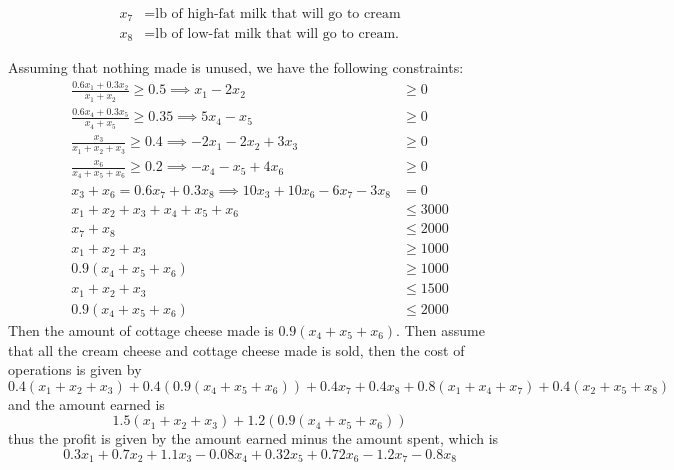 \documentclass{article}
\begin{document}
\begin{enumerate}
\begin{align*}
			x_7 &= \text{lb of high-fat milk that will go to cream} \\
			x_8 &= \text{lb of low-fat milk that will go to cream.} 
		\end{align*}
		\begin{soln}
			Assuming that nothing made is unused, we have the following constraints:
			\begin{align*}
				\frac{0.6x_1+0.3x_2}{x_1+x_2} \ge 0.5 \implies x_1-2x_2 &\ge 0 \\
				\frac{0.6x_4+0.3x_5}{x_4+x_5} \ge 0.35 \implies 5x_4-x_5 &\ge 0 \\
				\frac{x_3}{x_1+x_2+x_3} \ge 0.4 \implies -2x_1-2x_2+3x_3 &\ge 0 \\
				\frac{x_6}{x_4+x_5+x_6} \ge 0.2 \implies -x_4-x_5+4x_6 &\ge 0 \\
				x_3+x_6=0.6x_7+0.3x_8 \implies 10x_3+10x_6-6x_7-3x_8 &= 0 \\
				x_1+x_2+x_3+x_4+x_5+x_6 &\le 3000 \\
				x_7+x_8 &\le 2000 \\
				x_1+x_2+x_3 &\ge 1000 \\
				0.9(x_4+x_5+x_6) &\ge 1000 \\
				x_1+x_2+x_3 &\le 1500 \\
				0.9(x_4+x_5+x_6) &\le 2000
			\end{align*} 
			Then the amount of cottage cheese made is $0.9(x_4+x_5+x_6).$ Then assume that all the cream cheese and cottage cheese made is sold, then the cost of operations is given by \[0.4(x_1+x_2+x_3) + 0.4(0.9(x_4+x_5+x_6)) + 0.4x_7+0.4x_8+0.8(x_1+x_4+x_7) + 0.4(x_2+x_5+x_8)\] and the amount earned is \[1.5(x_1+x_2+x_3)+1.2(0.9(x_4+x_5+x_6))\] thus the profit is given by the amount earned minus the amount spent, which is \[0.3x_1+0.7x_2+1.1x_3 -0.08x_4+0.32x_5+0.72x_6-1.2x_7-0.8x_8\]


\end{soln}
\end{enumerate}
\end{document}
